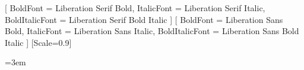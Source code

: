 

\usepackage{fontspec}

\usepackage{polyglossia}
\setmainlanguage{vietnamese}

\setmainfont{Liberation Serif}[
    BoldFont = Liberation Serif Bold,
    ItalicFont = Liberation Serif Italic,
    BoldItalicFont = Liberation Serif Bold Italic
]
\setsansfont{Liberation Sans}[
    BoldFont = Liberation Sans Bold,
    ItalicFont = Liberation Sans Italic,
    BoldItalicFont = Liberation Sans Bold Italic
]
\setmonofont{Liberation Mono}[Scale=0.9]

\usepackage[protrusion=true,expansion=false]{microtype}

\usepackage{xcolor}
\usepackage{graphicx}
\usepackage{hyperref}
\usepackage{calc}
\usepackage{url}

\newcommand{\TENLUANVAN}{Hệ thống phát hiện và cảnh báo té ngã thời gian thực tích hợp cảm biến, xử lý ảnh và định vị}
\newcommand{\THESISNAME}{Real-time fall detection and alert system integrating sensors, image processing, and positioning}

\newcommand{\TENTACGIA}{Nguyễn Văn A}
\newcommand{\MASOSV}{20123456}
\newcommand{\KHOA}{Điện - Điện tử}
\newcommand{\BOMON}{Viễn thông}
\newcommand{\TENNGUOIHUONGDAN}{TS. Trần Văn B}
\newcommand{\NAMBAOVE}{2025}

\newcommand{\DEPARTMENT}{\KHOA}
\newcommand{\TENTACGIAFACULTY}{\TENTACGIA}
\newcommand{\MSSV}{\MASOSV}
\newcommand{\TENCANBO}{\TENNGUOIHUONGDAN}

\usepackage{geometry}
\geometry{
    top=2.5cm,
    bottom=2.5cm,
    left=3.0cm,
    right=2.0cm,
    headheight=18pt,
    headsep=12pt,
    footskip=20pt
}
\usepackage{setspace}
\onehalfspacing
\usepackage{indentfirst}
\setlength{\parindent}{1.2em}
\setlength{\parskip}{0pt}
\emergencystretch=3em

